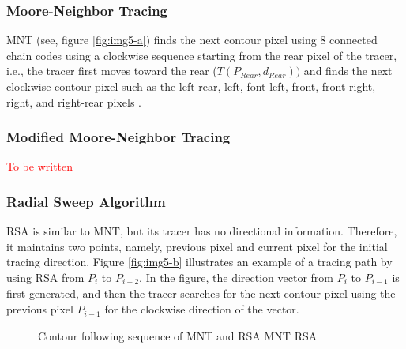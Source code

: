 \subsubsection{Moore-Neighbor Tracing}
MNT (see, figure \ref{fig:img5-a}) finds the next contour pixel using 8 connected chain codes using a clockwise sequence starting from the rear pixel of the tracer, i.e., the tracer first moves toward the rear ($T (P_{Rear}, d_{Rear}))$ and finds the next clockwise contour pixel such as the left-rear, left, font-left, front, front-right, right, and right-rear pixels \cite{Toussaint????Grids}. 

\subsubsection{Modified Moore-Neighbor Tracing}
\textcolor{red}{To be written}

\subsubsection{Radial Sweep Algorithm}
RSA \cite{Mirante1982Radial} is similar to MNT, but its tracer has no directional information. Therefore, it maintains two points, namely, previous pixel and current pixel for the initial tracing direction. Figure \ref{fig:img5-b} illustrates an example of a tracing path by using RSA from $P_i$ to $P_{i+2}$. In the figure, the direction vector from $P_i$ to $P_{i-1}$ is first generated, and then the tracer searches for the next contour pixel using the previous pixel $P_{i-1}$ for the clockwise direction of the vector.

\begin{figure}[htbp]
	\centering
	\caption{Contour following sequence of MNT and RSA \protect{} MNT \protect{} RSA}
	\label{fig:mnt_rsa}
\end{figure}

